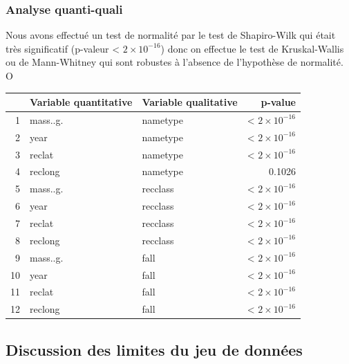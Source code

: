 \documentclass[12pt]{article}
\begin{document}
\subsubsection*{Analyse quanti-quali}
Nous avons effectué un test de normalité par le test de Shapiro-Wilk qui était très significatif (p-valeur < $2\times 10^{-16}$) donc on effectue le test de Kruskal-Wallis ou de Mann-Whitney qui sont robustes à l'absence de l'hypothèse de normalité. O
\begin{table}[H]
\centering
\begin{tabular}{rllr}
  \hline
 & Variable quantitative & Variable qualitative & p-value \\ 
  \hline
1 & mass..g. & nametype & < $2\times 10^{-16}$ \\ 
  2 & year & nametype &< $2\times 10^{-16}$  \\ 
  3 & reclat & nametype &< $2\times 10^{-16}$ \\ 
  4 & reclong & nametype & 0.1026 \\ 
  5 & mass..g. & recclass & < $2\times 10^{-16}$  \\ 
  6 & year & recclass & < $2\times 10^{-16}$  \\ 
  7 & reclat & recclass & < $2\times 10^{-16}$  \\ 
  8 & reclong & recclass & < $2\times 10^{-16}$  \\ 
  9 & mass..g. & fall &< $2\times 10^{-16}$  \\ 
  10 & year & fall & < $2\times 10^{-16}$  \\ 
  11 & reclat & fall &< $2\times 10^{-16}$  \\ 
  12 & reclong & fall &< $2\times 10^{-16}$  \\ 
   \hline
\end{tabular}
\end{table}

\subsection{Discussion des limites du jeu de données}
\end{document}
